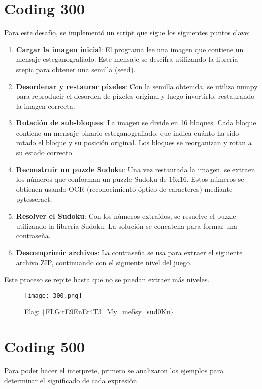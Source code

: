 \documentclass{article}
\begin{document}
\section*{Coding 300}
Para este desafío, se implementó un script que sigue los siguientes puntos clave:
\begin{enumerate}
  \item \textbf{Cargar la imagen inicial}: El programa lee una imagen que contiene un mensaje esteganografiado. Este mensaje se descifra utilizando la librería stepic para obtener una semilla (seed).

  \item \textbf{Desordenar y restaurar píxeles}: Con la semilla obtenida, se utiliza numpy para reproducir el desorden de píxeles original y luego invertirlo, restaurando la imagen correcta.

  \item \textbf{Rotación de sub-bloques}: La imagen se divide en 16 bloques. Cada bloque contiene un mensaje binario esteganografiado, que indica cuánto ha sido rotado el bloque y su posición original. Los bloques se reorganizan y rotan a su estado correcto.

  \item \textbf{Reconstruir un puzzle Sudoku}: Una vez restaurada la imagen, se extraen los números que conforman un puzzle Sudoku de 16x16. Estos números se obtienen usando OCR (reconocimiento óptico de caracteres) mediante pytesseract.

  \item \textbf{Resolver el Sudoku}: Con los números extraídos, se resuelve el puzzle utilizando la librería Sudoku. La solución se concatena para formar una contraseña.

  \item \textbf{Descomprimir archivos}: La contraseña se usa para extraer el siguiente archivo ZIP, continuando con el siguiente nivel del juego.
\end{enumerate}
Este proceso se repite hasta que no se puedan extraer más niveles.

\begin{figure}[H]
  \centering
  \texttt{[image: 300.png]}
  \caption{Flag: \{FLG:rE9EnEr4T3\_My\_me5sy\_sud0Ku\}}
\end{figure}
\section*{Coding 500}
Para poder hacer el interprete, primero se analizaron los ejemplos para determinar el significado de cada expresión.
\end{document}
